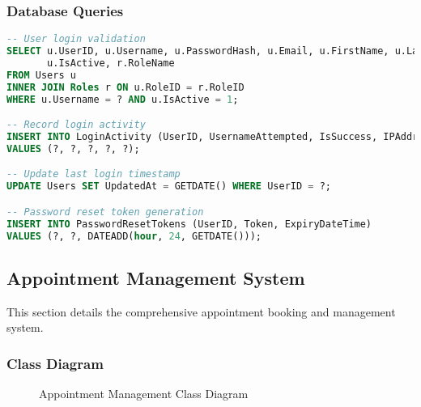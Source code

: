 \documentclass[12pt,a4paper]{article}
\begin{document}
\subsubsection{Database Queries}

\begin{lstlisting}[language=SQL, caption=User Authentication Queries]
-- User login validation
SELECT u.UserID, u.Username, u.PasswordHash, u.Email, u.FirstName, u.LastName, 
       u.IsActive, r.RoleName
FROM Users u
INNER JOIN Roles r ON u.RoleID = r.RoleID
WHERE u.Username = ? AND u.IsActive = 1;

-- Record login activity
INSERT INTO LoginActivity (UserID, UsernameAttempted, IsSuccess, IPAddress, UserAgent)
VALUES (?, ?, ?, ?, ?);

-- Update last login timestamp
UPDATE Users SET UpdatedAt = GETDATE() WHERE UserID = ?;

-- Password reset token generation
INSERT INTO PasswordResetTokens (UserID, Token, ExpiryDateTime)
VALUES (?, ?, DATEADD(hour, 24, GETDATE()));
\end{lstlisting}

\subsection{Appointment Management System}

This section details the comprehensive appointment booking and management system.

\subsubsection{Class Diagram}

\begin{figure}[H]
\centering
{}
\caption{Appointment Management Class Diagram}
\label{fig:appointment-class-diagram}
\end{figure}
\end{document}
